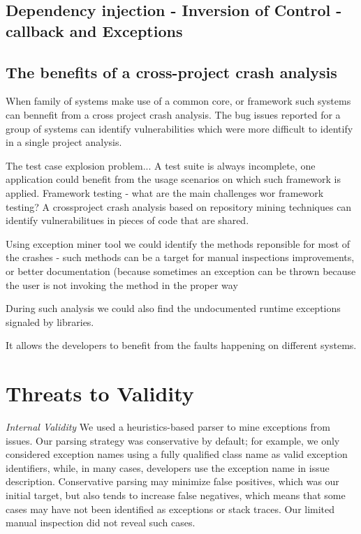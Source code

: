 \documentclass[conference]{IEEEtran}
\begin{document}
\subsection{Dependency injection - Inversion of Control -  callback and Exceptions}  

\subsection{The benefits of a cross-project crash analysis}  

When family of systems make use of a common core, or framework such systems can
bennefit from a cross project crash analysis. The bug issues reported for a group of systems
can identify vulnerabilities which were more difficult to identify in a single project analysis.

The test case explosion problem... A test suite is always incomplete,
one application could benefit from the usage scenarios on which such framework is applied.
Framework testing -  what are the main challenges wor framework testing?
A crossproject crash analysis based on repository mining techniques can 
identify vulnerabilitues in pieces of code that are shared. 

Using exception miner tool we could identify the methods reponsible for most of the crashes - 
such methods can be a target for manual inspections improvements, or better documentation
(because sometimes an exception can be thrown because the user is not invoking the method
in the proper way 

During such analysis we could also find the undocumented runtime exceptions 
signaled by libraries. 

It allows the developers to benefit from the faults happening on different systems.


\section{Threats to Validity}

\noindent\emph{Internal Validity} We used a heuristics-based parser to mine
exceptions from issues.  Our parsing strategy was conservative by default; for
example, we only considered exception names using a fully qualified class name
as valid exception identifiers, while, in many cases, developers use the
exception name in issue description. Conservative parsing may minimize false
positives, which was our initial target, but also tends to increase false
negatives, which means that some cases may have not been identified as
exceptions or stack traces. Our limited manual inspection did not reveal such
cases.
\end{document}
